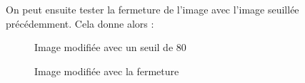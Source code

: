 \documentclass[french,a4paper,10pt]{article}
\begin{document}
	On peut ensuite tester la fermeture de l'image avec l'image seuillée précédemment.
	Cela donne alors :
	\begin{figure}[!htb]
		\begin{minipage}{0.48\textwidth}
			\centering
			\caption{Image modifiée avec un seuil de 80}\label{Fig:test-grey-08-4}
		\end{minipage}\hfill
		\begin{minipage}{0.48\textwidth}
			\centering
			\caption{Image modifiée avec la fermeture}\label{Fig:fermeture-test-grey-08}
		\end{minipage}
	\end{figure}
\end{document}
